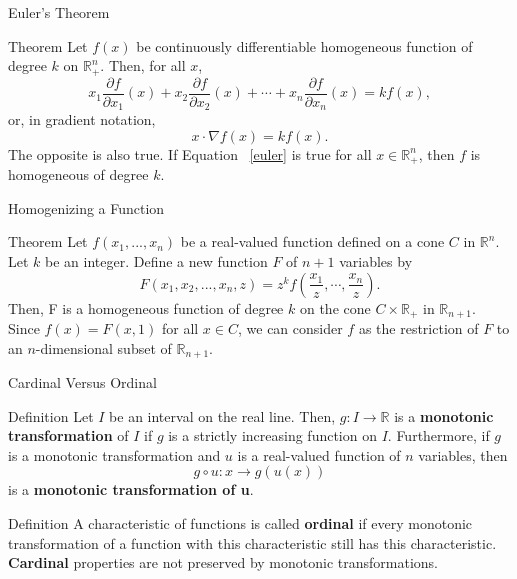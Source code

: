 \documentclass{beamer}
\begin{document}
\begin{frame}{Euler's Theorem}
    \begin{block}
{Theorem} 
Let $f(x)$ be continuously differentiable homogeneous function of degree $k$ on $\mathbb{R}_+^n. $ Then, for all $x$,
\begin{equation}
    x_1\frac{\partial f}{\partial x_1}(x)+x_2\frac{\partial f}{\partial x_2}(x)+\cdots +x_n\frac{\partial f}{ \partial x_n}(x)=kf(x), \label{euler}
\end{equation}
or, in gradient notation, 
\[x\cdot \nabla f(x)=k f(x).
\]
The opposite is also true. If Equation ~\eqref{euler} is true for all $x\in \mathbb{R}_+^n$, then $f$ is homogeneous of degree $k$. 
    \end{block}
\end{frame}

\begin{frame}{Homogenizing a Function}
    \begin{block}{Theorem}
    Let $f(x_1,...,x_n)$ be a real-valued function defined on a cone $C$ in $\mathbb{R}^n$. Let $k$ be an integer. Define a new function $F$ of $n+1$ variables by 
    \[F(x_1,x_2,..., x_n,z)=z^kf\left(\frac{x_1}{z}, \cdots,\frac{x_n}{z}\right).
    \]
    Then, F is a homogeneous function of degree $k$ on the cone $C\times \mathbb{R}_+$ in $\mathbb{R}_{n+1}$. Since $f(x)=F(x,1)$ for all $x\in C$, we can consider $f$ as the restriction of $F$ to an $n$-dimensional subset of $\mathbb{R}_{n+1}$. 
    \end{block}
\end{frame}

\begin{frame}{Cardinal Versus Ordinal}
    \begin{block}{Definition}
    Let $I$ be an interval on the real line. Then, $g:I\to \mathbb{R}$ is a \textbf{monotonic transformation} of $I$ if $g$ is a strictly increasing function on $I$. Furthermore, if $g$ is a monotonic transformation and $u$ is a real-valued function of $n$ variables, then 
    \[g \circ u:x\to g(u(x))
    \]
    is a \textbf{monotonic transformation of u}.
    \end{block}
    \begin{block}{Definition}
    A characteristic of functions is called \textbf{ordinal} if every monotonic transformation of a function with this characteristic still has this characteristic. 
    \textbf{Cardinal} properties are not preserved by monotonic transformations. 
    \end{block}
\end{frame}
\end{document}
